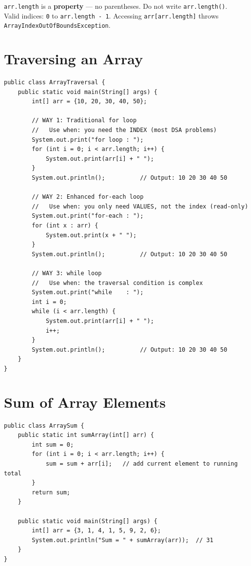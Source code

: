 \documentclass[12pt,a4paper,oneside]{book}
\begin{document}
\begin{warningbox}
\texttt{arr.length} is a \textbf{property} --- no parentheses. Do not write \texttt{arr.length()}.\\
Valid indices: \texttt{0} to \texttt{arr.length - 1}. Accessing \texttt{arr[arr.length]} throws \texttt{ArrayIndexOutOfBoundsException}.
\end{warningbox}

\section{Traversing an Array}

\begin{lstlisting}[caption={Three ways to traverse --- when to use each}]
public class ArrayTraversal {
    public static void main(String[] args) {
        int[] arr = {10, 20, 30, 40, 50};

        // WAY 1: Traditional for loop
        //   Use when: you need the INDEX (most DSA problems)
        System.out.print("for loop : ");
        for (int i = 0; i < arr.length; i++) {
            System.out.print(arr[i] + " ");
        }
        System.out.println();          // Output: 10 20 30 40 50

        // WAY 2: Enhanced for-each loop
        //   Use when: you only need VALUES, not the index (read-only)
        System.out.print("for-each : ");
        for (int x : arr) {
            System.out.print(x + " ");
        }
        System.out.println();          // Output: 10 20 30 40 50

        // WAY 3: while loop
        //   Use when: the traversal condition is complex
        System.out.print("while    : ");
        int i = 0;
        while (i < arr.length) {
            System.out.print(arr[i] + " ");
            i++;
        }
        System.out.println();          // Output: 10 20 30 40 50
    }
}
\end{lstlisting}

\section{Sum of Array Elements}

\begin{lstlisting}[caption={Sum of all elements --- accumulator pattern}]
public class ArraySum {
    public static int sumArray(int[] arr) {
        int sum = 0;
        for (int i = 0; i < arr.length; i++) {
            sum = sum + arr[i];   // add current element to running total
        }
        return sum;
    }

    public static void main(String[] args) {
        int[] arr = {3, 1, 4, 1, 5, 9, 2, 6};
        System.out.println("Sum = " + sumArray(arr));  // 31
    }
}
\end{lstlisting}
\end{document}
